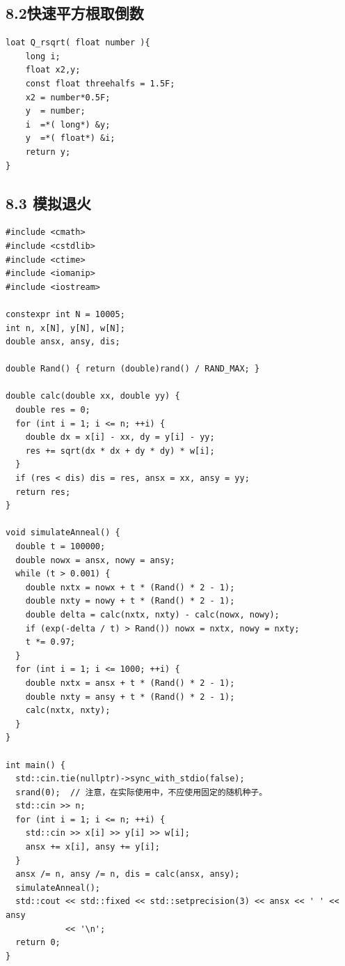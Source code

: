 \documentclass[UTF8,a4paper,11pt]{ctexart}
\begin{document}
\subsection*{8.2快速平方根取倒数}

\begin{Verbatim}[fontsize=\small,frame=single,breaklines=true,breakanywhere=true]
loat Q_rsqrt( float number ){
    long i;
    float x2,y;
    const float threehalfs = 1.5F;
    x2 = number*0.5F;
    y  = number;
    i  =*( long*) &y;
    y  =*( float*) &i;
    return y;
}
\end{Verbatim}


\subsection*{8.3 模拟退火}

\begin{Verbatim}[fontsize=\small,frame=single,breaklines=true,breakanywhere=true]
#include <cmath>
#include <cstdlib>
#include <ctime>
#include <iomanip>
#include <iostream>

constexpr int N = 10005;
int n, x[N], y[N], w[N];
double ansx, ansy, dis;

double Rand() { return (double)rand() / RAND_MAX; }

double calc(double xx, double yy) {
  double res = 0;
  for (int i = 1; i <= n; ++i) {
    double dx = x[i] - xx, dy = y[i] - yy;
    res += sqrt(dx * dx + dy * dy) * w[i];
  }
  if (res < dis) dis = res, ansx = xx, ansy = yy;
  return res;
}

void simulateAnneal() {
  double t = 100000;
  double nowx = ansx, nowy = ansy;
  while (t > 0.001) {
    double nxtx = nowx + t * (Rand() * 2 - 1);
    double nxty = nowy + t * (Rand() * 2 - 1);
    double delta = calc(nxtx, nxty) - calc(nowx, nowy);
    if (exp(-delta / t) > Rand()) nowx = nxtx, nowy = nxty;
    t *= 0.97;
  }
  for (int i = 1; i <= 1000; ++i) {
    double nxtx = ansx + t * (Rand() * 2 - 1);
    double nxty = ansy + t * (Rand() * 2 - 1);
    calc(nxtx, nxty);
  }
}

int main() {
  std::cin.tie(nullptr)->sync_with_stdio(false);
  srand(0);  // 注意，在实际使用中，不应使用固定的随机种子。
  std::cin >> n;
  for (int i = 1; i <= n; ++i) {
    std::cin >> x[i] >> y[i] >> w[i];
    ansx += x[i], ansy += y[i];
  }
  ansx /= n, ansy /= n, dis = calc(ansx, ansy);
  simulateAnneal();
  std::cout << std::fixed << std::setprecision(3) << ansx << ' ' << ansy
            << '\n';
  return 0;
}
\end{Verbatim}
\end{document}
